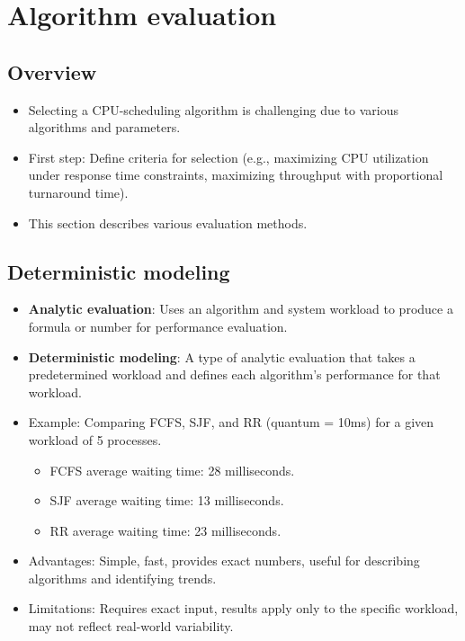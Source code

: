 \section{Algorithm evaluation}\label{sec:5.8}

\subsection{Overview}
\begin{itemize}
    \item Selecting a CPU-scheduling algorithm is challenging due to various algorithms and parameters.
    \item First step: Define criteria for selection (e.g., maximizing CPU utilization under response time constraints, maximizing throughput with proportional turnaround time).
    \item This section describes various evaluation methods.
\end{itemize}

\subsection{Deterministic modeling}
\begin{itemize}
    \item \textbf{Analytic evaluation}: Uses an algorithm and system workload to produce a formula or number for performance evaluation.
    \item \textbf{Deterministic modeling}: A type of analytic evaluation that takes a predetermined workload and defines each algorithm's performance for that workload.
    \item Example: Comparing FCFS, SJF, and RR (quantum = 10ms) for a given workload of 5 processes.
        \begin{itemize}
            \item FCFS average waiting time: 28 milliseconds.
            \item SJF average waiting time: 13 milliseconds.
            \item RR average waiting time: 23 milliseconds.
        \end{itemize}
    \item Advantages: Simple, fast, provides exact numbers, useful for describing algorithms and identifying trends.
    \item Limitations: Requires exact input, results apply only to the specific workload, may not reflect real-world variability.
\end{itemize}

